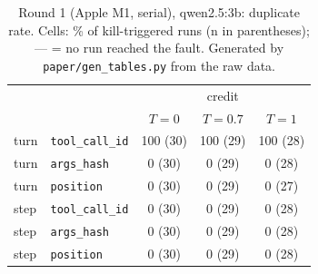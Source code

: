 \begin{table}[t]
\centering
\small
\begin{tabular}{llccc}
\toprule
 & & \multicolumn{3}{c}{credit} \\
 & & $T{=}0$ & $T{=}0.7$ & $T{=}1$ \\
\midrule
turn & \texttt{tool\_call\_id} & 100 {\scriptsize(30)} & 100 {\scriptsize(29)} & 100 {\scriptsize(28)} \\
turn & \texttt{args\_hash} & 0 {\scriptsize(30)} & 0 {\scriptsize(29)} & 0 {\scriptsize(28)} \\
turn & \texttt{position} & 0 {\scriptsize(30)} & 0 {\scriptsize(29)} & 0 {\scriptsize(27)} \\
\midrule
step & \texttt{tool\_call\_id} & 0 {\scriptsize(30)} & 0 {\scriptsize(29)} & 0 {\scriptsize(28)} \\
step & \texttt{args\_hash} & 0 {\scriptsize(30)} & 0 {\scriptsize(29)} & 0 {\scriptsize(28)} \\
step & \texttt{position} & 0 {\scriptsize(30)} & 0 {\scriptsize(29)} & 0 {\scriptsize(28)} \\
\bottomrule
\end{tabular}
\caption{Round 1 (Apple M1, serial), qwen2.5:3b: duplicate rate. Cells: \% of kill-triggered runs (n in parentheses); --- = no run reached the fault. Generated by \texttt{paper/gen\_tables.py} from the raw data.}
\label{tab:r1}
\end{table}


